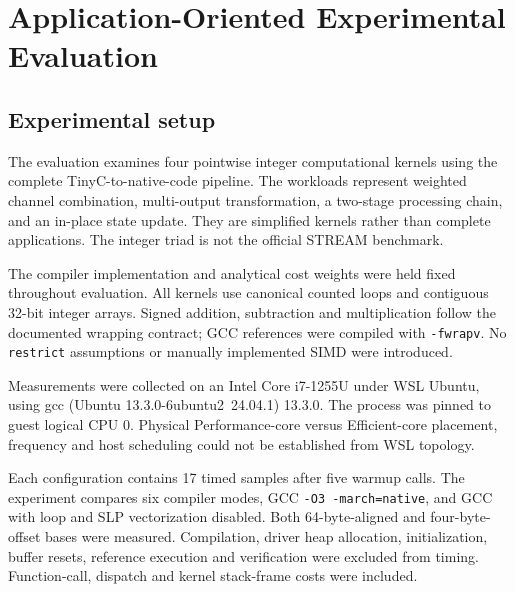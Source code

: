 


\providecommand{\AppEvalRoot}{benchmarks/applications}

\section{Application-Oriented Experimental Evaluation}

\label{sec:application-evaluation}

\subsection{Experimental setup}

The evaluation examines four pointwise integer computational kernels using the complete TinyC-to-native-code pipeline. The workloads represent weighted channel combination, multi-output transformation, a two-stage processing chain, and an in-place state update. They are simplified kernels rather than complete applications. The integer triad is not the official STREAM benchmark.

The compiler implementation and analytical cost weights were held fixed throughout evaluation. All kernels use canonical counted loops and contiguous 32-bit integer arrays. Signed addition, subtraction and multiplication follow the documented wrapping contract; GCC references were compiled with \texttt{-fwrapv}. No \texttt{restrict} assumptions or manually implemented SIMD were introduced.

Measurements were collected on an Intel Core i7-1255U under WSL Ubuntu, using gcc (Ubuntu 13.3.0-6ubuntu2~24.04.1) 13.3.0. The process was pinned to guest logical CPU 0. Physical Performance-core versus Efficient-core placement, frequency and host scheduling could not be established from WSL topology.

Each configuration contains 17 timed samples after five warmup calls. The experiment compares six compiler modes, GCC \texttt{-O3 -march=native}, and GCC with loop and SLP vectorization disabled. Both 64-byte-aligned and four-byte-offset bases were measured. Compilation, driver heap allocation, initialization, buffer resets, reference execution and verification were excluded from timing. Function-call, dispatch and kernel stack-frame costs were included.

